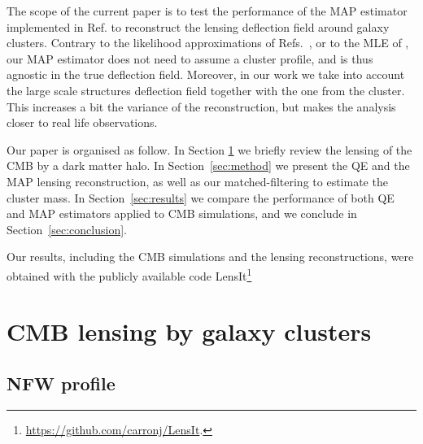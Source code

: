 \documentclass[prd, superscriptaddress, tightenlines, longbibliography, nofootinbib, eqsecnum, amsfonts, amsmath, floatfix, twocolumn, notitlepage]{revtex4-2}
\begin{document}
The scope of the current paper is to test the performance of the MAP estimator implemented in Ref. \cite{Carron:2017mqf} to reconstruct the lensing deflection field around galaxy clusters.
Contrary to the likelihood approximations of Refs.~\cite{ Yoo:2008bf, Yoo:2010jd}, or to the MLE of \cite{Lewis:2005fq, Baxter:2014frs, Raghunathan:2017cle}, our MAP estimator does not need to assume a cluster profile, and is thus agnostic in the true deflection field. Moreover, in our work we take into account the large scale structures deflection field together with the one from the cluster. This increases a bit the variance of the reconstruction, but makes the analysis closer to real life observations.

Our paper is organised as follow. In Section \ref{sec:model} we briefly review the lensing of the CMB by a dark matter halo. In Section~\ref{sec:method} we present the QE and the MAP lensing reconstruction, as well as our matched-filtering to estimate the cluster mass. In Section~\ref{sec:results} we compare the performance of both QE and MAP estimators applied to CMB simulations, and we conclude in Section~\ref{sec:conclusion}.

Our results, including the CMB simulations and the lensing reconstructions, were obtained with the publicly available code LensIt\footnote[1]{\url{https://github.com/carronj/LensIt}.}


\section{CMB lensing by galaxy clusters}
\label{sec:model}

\subsection{NFW profile}
\end{document}
